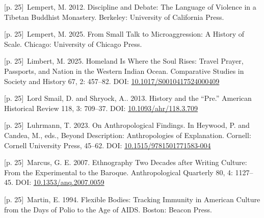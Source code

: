 \documentclass[10pt,a4paper]{article}
\begin{document}
\noindent\begin{minipage}[t]{\linewidth}{\scriptsize\color{gray} [p. 25]}\ Lempert, M. 2012. Discipline and Debate: The Language of Violence in a Tibetan Buddhist Monastery. Berkeley: University of California Press.\par\end{minipage}\par
\noindent\begin{minipage}[t]{\linewidth}{\scriptsize\color{gray} [p. 25]}\ Lempert, M. 2025. From Small Talk to Microaggression: A History of Scale. Chicago: University of Chicago Press.\par\end{minipage}\par
\noindent\begin{minipage}[t]{\linewidth}{\scriptsize\color{gray} [p. 25]}\ Limbert, M. 2025. Homeland Is Where the Soul Rises: Travel Prayer, Passports, and Nation in the Western Indian Ocean. Comparative Studies in Society and History 67, 2: 457–82. DOI: \url{10.1017/S0010417524000409}\par\end{minipage}\par
\noindent\begin{minipage}[t]{\linewidth}{\scriptsize\color{gray} [p. 25]}\ Lord Smail, D. and Shryock, A.. 2013. History and the “Pre.” American Historical Review 118, 3: 709–37. DOI: \url{10.1093/ahr/118.3.709}\par\end{minipage}\par
\noindent\begin{minipage}[t]{\linewidth}{\scriptsize\color{gray} [p. 25]}\ Luhrmann, T. 2023. On Anthropological Findings. In Heywood, P. and Candea, M., eds., Beyond Description: Anthropologies of Explanation. Cornell: Cornell University Press, 45–62. DOI: \url{10.1515/9781501771583-004}\par\end{minipage}\par
\noindent\begin{minipage}[t]{\linewidth}{\scriptsize\color{gray} [p. 25]}\ Marcus, G. E. 2007. Ethnography Two Decades after Writing Culture: From the Experimental to the Baroque. Anthropological Quarterly 80, 4: 1127–45. DOI: \url{10.1353/anq.2007.0059}\par\end{minipage}\par
\noindent\begin{minipage}[t]{\linewidth}{\scriptsize\color{gray} [p. 25]}\ Martin, E. 1994. Flexible Bodies: Tracking Immunity in American Culture from the Days of Polio to the Age of AIDS. Boston: Beacon Press.\par\end{minipage}\par
\end{document}
